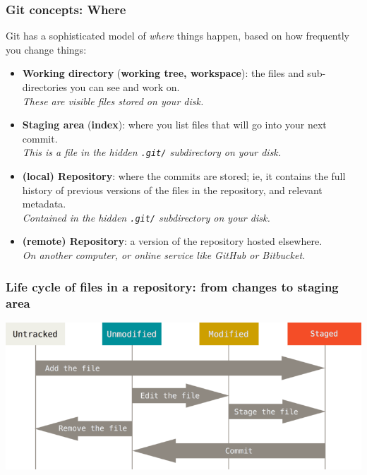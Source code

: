 \documentclass[10pt,svgnames,handout]{beamer}
\begin{document}
\begin{frame}
\frametitle{Git concepts: Where}

Git has a sophisticated model of \emph{where} things happen, based on how frequently you change things:

\begin{itemize}
\item \textbf{Working directory} (\textbf{working tree, workspace}): the files and sub-directories you can see and work on.\\
\emph{These are visible files stored on your disk.}
\smallskip

\item \textbf{Staging area} (\textbf{index}): where you list files that will go into your next commit.\\
\emph{This is a file in the hidden \texttt{.git/} subdirectory on your disk.}\smallskip

\item \textbf{(local) Repository}: where the commits are stored; ie, it contains the full history of previous versions of the files in the repository, and relevant metadata.\\
\emph{Contained in the hidden \texttt{.git/} subdirectory on your disk.}
\smallskip

\item \textbf{(remote) Repository}: a version of the repository hosted elsewhere.\\
\emph{On another computer, or online service like GitHub or Bitbucket.}
\end{itemize}
\end{frame}


\begin{frame}
\frametitle{Life cycle of files in a repository: from changes to staging area}
\begin{centering}
\includegraphics[width=\linewidth]{figures/lifecycle.png}
\end{centering}
\end{frame}
\end{document}
